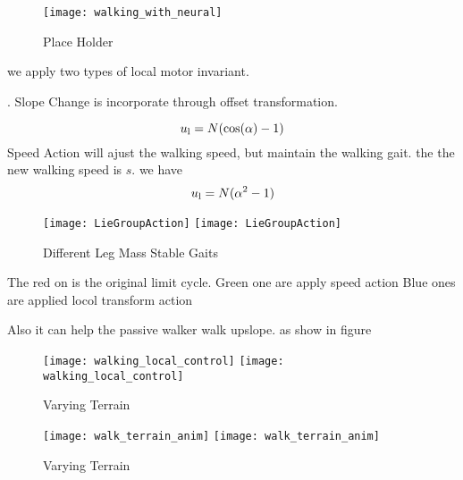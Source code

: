\begin{figure}[!htbp]
  \begin{center}
      \texttt{[image: walking\_with\_neural]}
    \caption{Place Holder}
    \label{fig:withoutlocalcontroller}
\end{center}
\end{figure}

we apply two types of local motor invariant.
\begin{itemize}

.
Slope Change is incorporate through offset transformation.

\[
u_{\mathrm{l}}=N(\mathrm{cos}(\alpha)-1)
\]
Speed Action will ajust the walking speed, but maintain the walking gait.
the the new walking speed is $s$.
we have
\[  
u_{\mathrm{l}}=N(\alpha^2-1)
\]
\end{itemize}

\begin{figure}[!htbp]
  \begin{center}
    \leavevmode
    \ifpdf
      \texttt{[image: LieGroupAction]}
    \else
      \texttt{[image: LieGroupAction]}
    \fi
    \caption{Different Leg Mass Stable Gaits}
    \label{fig:differentlr}
\end{center}
\end{figure}

The red on is the original limit cycle.
Green one are apply speed action
Blue ones are applied  locol transform action

Also it can help the passive walker walk upslope.
as show in figure


\begin{figure}[!htbp]
  \begin{center}
    \leavevmode
    \ifpdf
      \texttt{[image: walking\_local\_control]}
    \else
      \texttt{[image: walking\_local\_control]}
    \fi
    \caption{Varying Terrain}
    \label{fig:diffterrain}
\end{center}
\end{figure}




\begin{figure}[!htbp]
  \begin{center}
    \leavevmode
    \ifpdf
      \texttt{[image: walk\_terrain\_anim]}
    \else
      \texttt{[image: walk\_terrain\_anim]}
    \fi
    \caption{Varying Terrain}
    \label{fig:diffterrain}
\end{center}
\end{figure}



